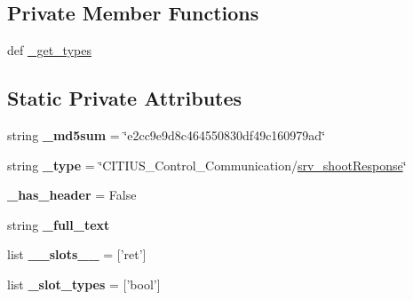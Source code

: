 \subsection*{\-Private \-Member \-Functions}
\begin{DoxyCompactItemize}
\item 
def \hyperlink{class_c_i_t_i_u_s___control___communication_1_1srv_1_1__srv__shoot_1_1srv__shoot_response_ae82d6eba27d6664271cb545797c70453}{\-\_\-get\-\_\-types}
\end{DoxyCompactItemize}
\subsection*{\-Static \-Private \-Attributes}
\begin{DoxyCompactItemize}
\item 
\hypertarget{class_c_i_t_i_u_s___control___communication_1_1srv_1_1__srv__shoot_1_1srv__shoot_response_a6c31b7118c3016b25de295f819974eb1}{string {\bfseries \-\_\-md5sum} = \char`\"{}e2cc9e9d8c464550830df49c160979ad\char`\"{}}\label{class_c_i_t_i_u_s___control___communication_1_1srv_1_1__srv__shoot_1_1srv__shoot_response_a6c31b7118c3016b25de295f819974eb1}

\item 
\hypertarget{class_c_i_t_i_u_s___control___communication_1_1srv_1_1__srv__shoot_1_1srv__shoot_response_a9f92101d56f5982a51d4765e9b9e60ff}{string {\bfseries \-\_\-type} = \char`\"{}\-C\-I\-T\-I\-U\-S\-\_\-\-Control\-\_\-\-Communication/\hyperlink{class_c_i_t_i_u_s___control___communication_1_1srv_1_1__srv__shoot_1_1srv__shoot_response}{srv\-\_\-shoot\-Response}\char`\"{}}\label{class_c_i_t_i_u_s___control___communication_1_1srv_1_1__srv__shoot_1_1srv__shoot_response_a9f92101d56f5982a51d4765e9b9e60ff}

\item 
\hypertarget{class_c_i_t_i_u_s___control___communication_1_1srv_1_1__srv__shoot_1_1srv__shoot_response_a7d1e1289aa7ab8fe64ba1ae1c8d2672c}{{\bfseries \-\_\-has\-\_\-header} = \-False}\label{class_c_i_t_i_u_s___control___communication_1_1srv_1_1__srv__shoot_1_1srv__shoot_response_a7d1e1289aa7ab8fe64ba1ae1c8d2672c}

\item 
string {\bfseries \-\_\-full\-\_\-text}
\item 
\hypertarget{class_c_i_t_i_u_s___control___communication_1_1srv_1_1__srv__shoot_1_1srv__shoot_response_a03cd58de43a0a1c98a99ebd3b81f8ff4}{list {\bfseries \-\_\-\-\_\-slots\-\_\-\-\_\-} = \mbox{[}'ret'\mbox{]}}\label{class_c_i_t_i_u_s___control___communication_1_1srv_1_1__srv__shoot_1_1srv__shoot_response_a03cd58de43a0a1c98a99ebd3b81f8ff4}

\item 
\hypertarget{class_c_i_t_i_u_s___control___communication_1_1srv_1_1__srv__shoot_1_1srv__shoot_response_a8c956cf9de3d0ff9c69e874291e027d8}{list {\bfseries \-\_\-slot\-\_\-types} = \mbox{[}'bool'\mbox{]}}\label{class_c_i_t_i_u_s___control___communication_1_1srv_1_1__srv__shoot_1_1srv__shoot_response_a8c956cf9de3d0ff9c69e874291e027d8}

\end{DoxyCompactItemize}


